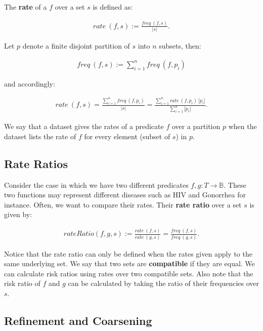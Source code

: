 \documentclass[]{article}
\begin{document}
The \textbf{rate} of a \(f\) over a set \(s\) is defined as:

\begin{align*}
rate\ (f, s) := \frac{freq\ (f, s)}{|s|}.
\end{align*}

Let \(p\) denote a finite disjoint partition of \(s\) into \(n\)
subsets, then:

\begin{align*}
freq\ (f, s) := \sum_{i=1}^n freq\ (f, p_i)
\end{align*}

and accordingly:

\begin{align}
rate\ (f, s) = \frac{\sum_{i=1}^n freq\ (f, p_i)}{|s|} = \frac{\sum_{i=1}^n rate\ (f, p_i)\ |p_i|}{\sum_{i=1}^n|p_i|}.
\end{align}

We say that a dataset gives the rates of a predicate \(f\) over a
partition \(p\) when the dataset lists the rate of \(f\) for every
element (subset of \(s\)) in \(p\).

\hypertarget{rate-ratios}{%
\subsection{Rate Ratios}\label{rate-ratios}}

Consider the case in which we have two different predicates
\(f, g: T \rightarrow \mathbb{B}\). These two functions may represent
different diseases such as HIV and Gonorrhea for instance. Often, we
want to compare their rates. Their \textbf{rate ratio} over a set \(s\)
is given by:

\begin{align*}
rateRatio (f, g, s) := \frac{rate\ (f, s)}{rate\ (g, s)} = \frac{freq\ (f, s)}{freq\ (g, s)}.
\end{align*}

Notice that the rate ratio can only be defined when the rates given
apply to the same underlying set. We say that two sets are
\textbf{compatible} if they are equal. We can calculate risk ratios
using rates over two compatible sets. Also note that the risk ratio of
\(f\) and \(g\) can be calculated by taking the ratio of their
frequencies over \(s\).

\hypertarget{refinement-and-coarsening}{%
\subsection{Refinement and Coarsening}\label{refinement-and-coarsening}}
\end{document}
